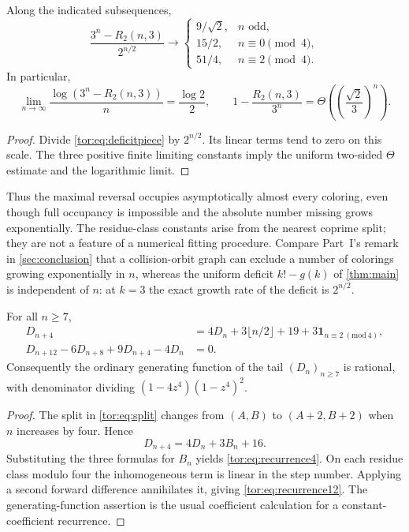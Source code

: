 \documentclass[11pt,a4paper]{article}
\numberwithin{equation}{section}
\theoremstyle{definition}
\theoremstyle{remark}
\newcommand{\bbone}{\mathbf 1}
\begin{document}
\begin{corollary}\label{tor:cor:asymptotic}
Along the indicated subsequences,
\begin{equation}\label{tor:eq:limits}
 \frac{3^n-R_2(n,3)}{2^{n/2}}\longrightarrow
 \begin{cases}
 9/\sqrt2,&n\text{ odd},\\
 15/2,&n\equiv0\pmod4,\\
 51/4,&n\equiv2\pmod4.
 \end{cases}
\end{equation}
In particular,
\[
 \lim_{n\to\infty}\frac{\log(3^n-R_2(n,3))}{n}
 =\frac{\log2}{2},\qquad
 1-\frac{R_2(n,3)}{3^n}
 =\Theta\!\left(\left(\frac{\sqrt2}{3}\right)^n\right).
\]
\end{corollary}
\begin{proof}
Divide \eqref{tor:eq:deficitpiece} by $2^{n/2}$. Its linear terms tend to
zero on this scale. The three positive finite limiting constants imply the
uniform two-sided $\Theta$ estimate and the logarithmic limit.
\end{proof}

Thus the maximal reversal occupies asymptotically almost every coloring, even
though full occupancy is impossible and the absolute number missing grows
exponentially. The residue-class constants arise from the nearest coprime
split; they are not a feature of a numerical fitting procedure. Compare
Part~I's remark in \cref{sec:conclusion} that a collision-orbit graph can
exclude a number of colorings growing exponentially in $n$, whereas the
uniform deficit $k!-g(k)$ of \cref{thm:main} is independent of $n$: at $k=3$
the exact growth rate of the deficit is $2^{n/2}$.

\begin{corollary}\label{tor:cor:recurrence}
For all $n\ge7$,
\begin{align}
 D_{n+4}&=4D_n+3\lfloor n/2\rfloor+19
              +3\bbone_{n\equiv2\ (\mathrm{mod}\ 4)},\label{tor:eq:recurrence4}\\
 D_{n+12}-6D_{n+8}+9D_{n+4}-4D_n&=0.\label{tor:eq:recurrence12}
\end{align}
Consequently the ordinary generating function of the tail $(D_n)_{n\ge7}$ is
rational, with denominator dividing $(1-4z^4)(1-z^4)^2$.
\end{corollary}
\begin{proof}
The split in \eqref{tor:eq:split} changes from $(A,B)$ to $(A+2,B+2)$ when $n$
increases by four. Hence
\[
 D_{n+4}=4D_n+3B_n+16.
\]
Substituting the three formulas for $B_n$ yields \eqref{tor:eq:recurrence4}.
On each residue class modulo four the inhomogeneous term is linear in the step
number. Applying a second forward difference annihilates it, giving
\eqref{tor:eq:recurrence12}. The generating-function assertion is the usual
coefficient calculation for a constant-coefficient recurrence.
\end{proof}
\end{document}
